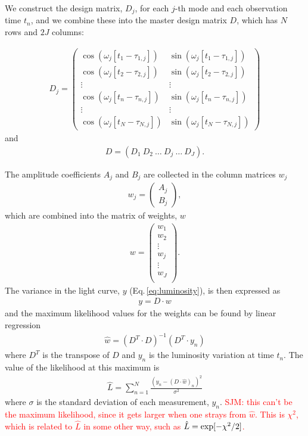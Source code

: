 \documentclass[a4paper,fleqn,usenatbib]{mnras}
\newcommand{\red}{\textcolor{red} }
\begin{document}
We construct the design matrix, $D_j$, for each $j$-th mode and each observation time $t_n$, and we combine these into the master design matrix $D$, which has $N$ rows and $2J$ columns:

\begin{eqnarray}
D_j = \left( \begin{array}{cc}
	\cos (\omega_j[t_1 - \tau_{1,j}])& \sin (\omega_j[t_1 - \tau_{1,j}]) \\
	\cos (\omega_j[t_2 - \tau_{2,j}])& \sin (\omega_j[t_2 - \tau_{2,j}]) \\
	\vdots & \vdots\\
	\cos (\omega_j[t_n - \tau_{n,j}])& \sin (\omega_j[t_n - \tau_{n,j}]) \\
	\vdots & \vdots \\
	\cos (\omega_j[t_N - \tau_{N,j}])& \sin (\omega_j[t_N - \tau_{N,j}])
	\end{array}\right)
\label{eq:Dj}
\end{eqnarray}
and
\begin{eqnarray}
D = (D_1~D_2~\dots~D_j~\dots~D_J).
\label{eq:D}
\end{eqnarray}

The amplitude coefficients $A_j$ and $B_j$ are collected in the column matrices $w_j$
\begin{eqnarray}
w_j = \left( \begin{array}{c}
	A_j \\
	B_j
	\end{array} \right),
\label{eq:DW}
\end{eqnarray}
which are combined into the matrix of weights, $w$
\begin{eqnarray}
w = \left( \begin{array}{c}
	w_1 \\
	w_2 \\
	\vdots \\
	w_j \\
	\vdots \\
	w_J \\
	\end{array} \right).
\label{eq:w}
\end{eqnarray}
The variance in the light curve, $y$ (Eq.\,\ref{eq:luminosity}), is then expressed as
\begin{eqnarray}
y = D \cdot w
\label{eq:DW}
\end{eqnarray}
and the maximum likelihood values for the weights can be found by linear regression
\begin{eqnarray}
\hat w = (D^T \cdot D)^{-1}(D^T \cdot y_n)
\label{eq:What}
\end{eqnarray}
where $D^T$ is the transpose of $D$ and $y_n$ is the luminosity variation at time $t_n$. The value of the likelihood at this maximum is
\begin{eqnarray}
\hat L = \sum_{n=1}^N \frac{\left( y_n - (D\cdot \hat w)_n \right)^2}{\sigma^2}
\label{eq:chisq}
\end{eqnarray}
where $\sigma$ is the standard deviation of each measurement, $y_n$. \red{SJM: this can't be the maximum likelihood, since it gets larger when one strays from $\hat w$. This is $\chi^2$, which is related to $\hat L$ in some other way, such as $\hat L = {\rm exp}[-\chi^2/2]$.}
\end{document}
